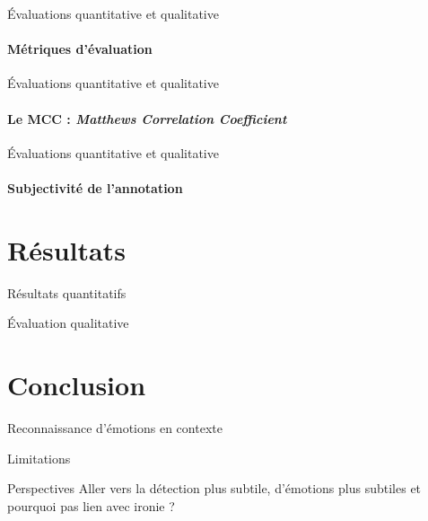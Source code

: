 \documentclass[11pt,aspectratio=169]{beamer}
\begin{document}
\begin{frame}{Évaluations quantitative et qualitative}
    \framesubtitle{Métriques d'évaluation}
    
\end{frame}

\begin{frame}{Évaluations quantitative et qualitative}
    \framesubtitle{Le MCC : \textsl{Matthews Correlation Coefficient}}
    
\end{frame}

\begin{frame}{Évaluations quantitative et qualitative}
    \framesubtitle{Subjectivité de l'annotation}
    
\end{frame}

\section{Résultats}

\begin{frame}{Résultats quantitatifs}
    
\end{frame}

\begin{frame}{Évaluation qualitative}
    
\end{frame}

\section{Conclusion}

\begin{frame}{Reconnaissance d'émotions en contexte}
    
\end{frame}

\begin{frame}{Limitations}
    
\end{frame}

\begin{frame}{Perspectives}
    Aller vers la détection plus subtile, d'émotions plus subtiles et pourquoi pas lien avec ironie ?
\end{frame}
\end{document}
